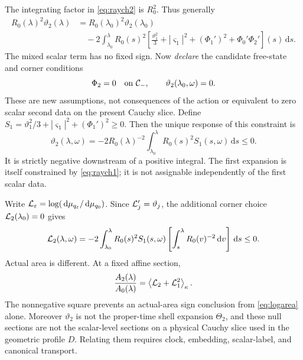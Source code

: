 \documentclass[11pt]{article}
\newcommand{\dd}{\,\mathrm d}
\newcommand{\eps}{\varepsilon}
\begin{document}
The integrating factor in \eqref{eq:raych2} is $R_0^2$. Thus generally
\begin{equation}
\begin{aligned}
 R_0(\lambda)^2\vartheta_2(\lambda)
 &=R_0(\lambda_0)^2\vartheta_2(\lambda_0)\\
 &\quad-2\int_{\lambda_0}^{\lambda}R_0(s)^2
 \left[\frac{\vartheta_1^2}{3}+|\varsigma_1|^2
                 +(\Phi_1')^2+\Phi_0'\Phi_2'\right](s)\dd s.
\end{aligned}
\label{eq:generalnull}
\end{equation}
The mixed scalar term has no fixed sign. Now \emph{declare} the candidate
free-state and corner conditions
\begin{equation}
 \Phi_2=0\quad\hbox{on }{\cal C}_-,\qquad
 \vartheta_2(\lambda_0,\omega)=0.
 \label{eq:newstate}
\end{equation}
These are new assumptions, not consequences of the action or equivalent
to zero scalar second data on the present Cauchy slice. Define
$S_1=\vartheta_1^2/3+|\varsigma_1|^2+(\Phi_1')^2\ge0$.
Then the unique response of this constraint is
\begin{equation}
 \vartheta_2(\lambda,\omega)
 =-2R_0(\lambda)^{-2}
      \int_{\lambda_0}^{\lambda}R_0(s)^2S_1(s,\omega)\dd s\le0.
 \label{eq:nullsign}
\end{equation}
It is strictly negative downstream of a positive integral.
The first expansion is itself constrained by \eqref{eq:raych1};
it is not assignable independently of the first scalar data.

Write $ {\cal L}_\eps=\log(\dd\mu_{q_\eps}/\dd\mu_{q_0})$.
Since $ {\cal L}_j'=\vartheta_j$, the additional corner choice
$ {\cal L}_2(\lambda_0)=0$ gives
\begin{equation}
 {\cal L}_2(\lambda,\omega)
 =-2\int_{\lambda_0}^{\lambda}R_0(s)^2S_1(s,\omega)
       \left[\int_s^\lambda R_0(v)^{-2}\dd v\right]\dd s\le0.
 \label{eq:logarea}
\end{equation}
Actual area is different. At a fixed affine section,
\begin{equation}
 \frac{A_2(\lambda)}{A_0(\lambda)}
       =\left\langle{\cal L}_2+{\cal L}_1^2\right\rangle_\kappa.
 \label{eq:actualarea}
\end{equation}
The nonnegative square prevents an actual-area sign conclusion from
\eqref{eq:logarea} alone. Moreover $\vartheta_2$ is not the proper-time
shell expansion $\Theta_2$, and these null sections are not the
scalar-level sections on a physical Cauchy slice used in the geometric
profile $D$. Relating them requires clock, embedding, scalar-label,
and canonical transport.
\end{document}
